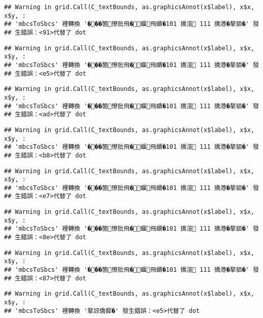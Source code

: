 \documentclass[
]{article}
\begin{document}
\begin{verbatim}
## Warning in grid.Call(C_textBounds, as.graphicsAnnot(x$label), x$x, x$y, :
## 'mbcsToSbcs' 裡轉換 '���箇憭批飛�蝘飛蝟�101 撟渲 111 撟港�摮貊�' 發
## 生錯誤：<91>代替了 dot
\end{verbatim}

\begin{verbatim}
## Warning in grid.Call(C_textBounds, as.graphicsAnnot(x$label), x$x, x$y, :
## 'mbcsToSbcs' 裡轉換 '���箇憭批飛�蝘飛蝟�101 撟渲 111 撟港�摮貊�' 發
## 生錯誤：<e5>代替了 dot
\end{verbatim}

\begin{verbatim}
## Warning in grid.Call(C_textBounds, as.graphicsAnnot(x$label), x$x, x$y, :
## 'mbcsToSbcs' 裡轉換 '���箇憭批飛�蝘飛蝟�101 撟渲 111 撟港�摮貊�' 發
## 生錯誤：<ad>代替了 dot
\end{verbatim}

\begin{verbatim}
## Warning in grid.Call(C_textBounds, as.graphicsAnnot(x$label), x$x, x$y, :
## 'mbcsToSbcs' 裡轉換 '���箇憭批飛�蝘飛蝟�101 撟渲 111 撟港�摮貊�' 發
## 生錯誤：<b8>代替了 dot
\end{verbatim}

\begin{verbatim}
## Warning in grid.Call(C_textBounds, as.graphicsAnnot(x$label), x$x, x$y, :
## 'mbcsToSbcs' 裡轉換 '���箇憭批飛�蝘飛蝟�101 撟渲 111 撟港�摮貊�' 發
## 生錯誤：<e7>代替了 dot
\end{verbatim}

\begin{verbatim}
## Warning in grid.Call(C_textBounds, as.graphicsAnnot(x$label), x$x, x$y, :
## 'mbcsToSbcs' 裡轉換 '���箇憭批飛�蝘飛蝟�101 撟渲 111 撟港�摮貊�' 發
## 生錯誤：<8e>代替了 dot
\end{verbatim}

\begin{verbatim}
## Warning in grid.Call(C_textBounds, as.graphicsAnnot(x$label), x$x, x$y, :
## 'mbcsToSbcs' 裡轉換 '���箇憭批飛�蝘飛蝟�101 撟渲 111 撟港�摮貊�' 發
## 生錯誤：<87>代替了 dot
\end{verbatim}

\begin{verbatim}
## Warning in grid.Call(C_textBounds, as.graphicsAnnot(x$label), x$x, x$y, :
## 'mbcsToSbcs' 裡轉換 '摮詨僑摨�' 發生錯誤：<e5>代替了 dot
\end{verbatim}
\end{document}
